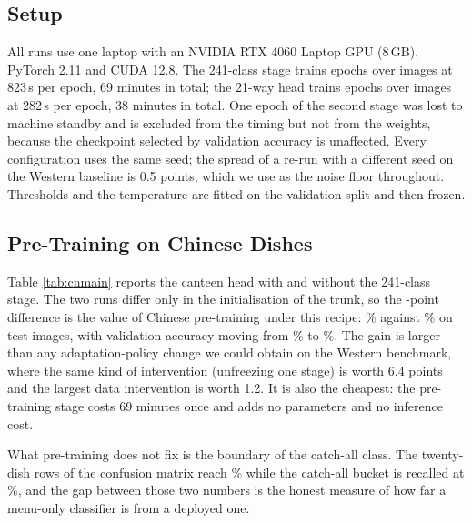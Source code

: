 \documentclass[conference]{IEEEtran}
\begin{document}
\subsection{Setup}
All runs use one laptop with an NVIDIA RTX 4060 Laptop GPU (8\,GB), PyTorch 2.11
and CUDA 12.8. The 241-class stage trains \cnPreEpochs{} epochs over
\cnPreTrainN{} images at 823\,s per epoch, 69 minutes in total; the 21-way head
trains \cnEpochs{} epochs over \cnTrainN{} images at 282\,s per epoch, 38 minutes
in total. One epoch of the second stage was lost to machine standby and is
excluded from the timing but not from the weights, because the checkpoint
selected by validation accuracy is unaffected. Every configuration uses the same
seed; the spread of a re-run with a different seed on the Western baseline is
0.5 points, which we use as the noise floor throughout. Thresholds and the
temperature are fitted on the validation split and then frozen.

\subsection{Pre-Training on Chinese Dishes}
\label{sec:pretrain}
Table \ref{tab:cnmain} reports the canteen head with and without the 241-class
stage. The two runs differ only in the initialisation of the trunk, so the
\cnGainPretrain-point difference is the value of Chinese pre-training under this
recipe: \cnNoPreTest\% against \cnTest\% on \cnTestN{} test images, with validation
accuracy moving from \cnNoPreVal\% to \cnVal\%. The gain is larger than any
adaptation-policy change we could obtain on the Western benchmark, where the same
kind of intervention (unfreezing one stage) is worth 6.4 points and the largest
data intervention is worth 1.2. It is also the cheapest: the pre-training stage
costs 69 minutes once and adds no parameters and no inference cost.

What pre-training does not fix is the boundary of the catch-all class. The
twenty-dish rows of the confusion matrix reach \cnDishAcc\% while the catch-all
bucket is recalled at \cnOtherRecall\%, and the gap between those two numbers is
the honest measure of how far a menu-only classifier is from a deployed one.
\end{document}
